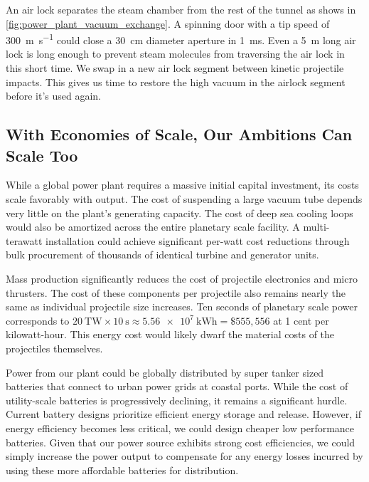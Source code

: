 \documentclass{article}
\begin{document}
An air lock separates the steam chamber from the rest of the tunnel as shows in \autoref{fig:power_plant_vacuum_exchange}.   A spinning door with a tip speed of \SI{300}{\meter\per\second} could close a \SI{30}{\centi\meter} diameter aperture in \SI{1}{\milli\second}.  Even a \SI{5}{\meter} long air lock is long enough to prevent steam molecules from traversing the air lock in this short time.   We swap in a new air lock segment between kinetic projectile impacts.  This gives us time to restore the high vacuum in the airlock segment before it's used again.   


\subsection{With Economies of Scale, Our Ambitions Can Scale Too}\label{sec:strawway_economics}

While a global power plant requires a massive initial capital investment, its costs scale favorably with output. The cost of suspending a large vacuum tube depends very little on the plant's generating capacity. The cost of deep sea cooling loops would also be amortized across the entire planetary scale facility.  A multi-terawatt installation could achieve significant per-watt cost reductions through bulk procurement of thousands of identical turbine and generator units. 

Mass production significantly reduces the cost of projectile electronics and micro thrusters. The cost of these components per projectile also remains nearly the same as individual projectile size increases.  Ten seconds of planetary scale power corresponds to $\SI{20}{\tera\watt} \times \SI{10}{\second} \approx \SI{5.56e7}{\kilo\watt\hour} = \$555,556$ at 1 cent per kilowatt-hour.  This energy cost would likely dwarf the material costs of the projectiles themselves.      

Power from our plant could be globally distributed by super tanker sized batteries that connect to urban power grids at coastal ports.  While the cost of utility-scale batteries is progressively declining, it remains a significant hurdle. Current battery designs prioritize efficient energy storage and release. However, if energy efficiency becomes less critical, we could design cheaper low performance batteries. Given that our power source exhibits strong cost efficiencies, we could simply increase the power output to compensate for any energy losses incurred by using these more affordable batteries for distribution. 
\end{document}
